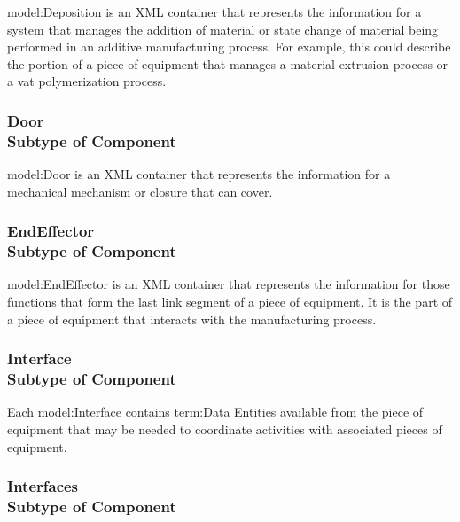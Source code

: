 \FloatBarrier

{model:Deposition} is an XML container that represents the information for a system that manages the addition of material or state change of material being performed in an additive manufacturing process.  For example, this could describe the portion of a piece of equipment that manages a material extrusion process or a vat polymerization process.

\FloatBarrier
\subsubsection[Door]{Door \\ {\small Subtype of Component}}
  \label{type:Door}

\FloatBarrier

{model:Door} is an XML container that represents the information for a mechanical mechanism or closure that can cover.

\FloatBarrier
\subsubsection[EndEffector]{EndEffector \\ {\small Subtype of Component}}
  \label{type:EndEffector}

\FloatBarrier

{model:EndEffector} is an XML container that represents the information for those functions that form the last link segment of a piece of equipment. It is the part of a piece of equipment that interacts with the manufacturing process.

\FloatBarrier
\subsubsection[Interface]{Interface \\ {\small Subtype of Component}}
  \label{type:Interface}

\FloatBarrier

Each {model:Interface} contains {term:Data Entities} available from the piece of equipment that may be needed to coordinate activities with associated pieces of equipment.

\FloatBarrier
\subsubsection[Interfaces]{Interfaces \\ {\small Subtype of Component}}
  \label{type:Interfaces}

